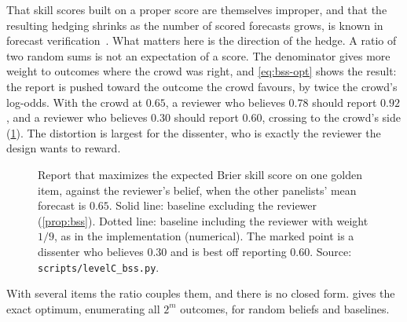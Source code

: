 That skill scores built on a proper score are themselves improper, and that the resulting hedging
shrinks as the number of scored forecasts grows, is known in forecast
verification~\cite{murphy1973hedging}. What matters here is the direction of the hedge. A ratio of
two random sums is not an expectation of a score. The denominator gives more weight to outcomes
where the crowd was right, and \eqref{eq:bss-opt} shows the result: the report is pushed
toward the outcome the crowd favours, by twice the crowd's log-odds. With the crowd at $0.65$,
a reviewer who believes $0.78$ should report $0.92$, and a reviewer who believes $0.30$ should
report $0.60$, crossing to the crowd's side (\cref{fig:bss}). The distortion is largest for the
dissenter, who is exactly the reviewer the design wants to reward.

\begin{figure}[t]
\centering
{}
\caption{Report that maximizes the expected Brier skill score on one golden item, against the
reviewer's belief, when the other panelists' mean forecast is $0.65$. Solid line: baseline
excluding the reviewer (\cref{prop:bss}). Dotted line: baseline including the reviewer with
weight $1/9$, as in the implementation (numerical). The marked point is a dissenter who
believes $0.30$ and is best off reporting $0.60$. Source: \texttt{scripts/levelC\_bss.py}.}
\label{fig:bss}
\end{figure}

With several items the ratio couples them, and there is no closed form.  gives the
exact optimum, enumerating all $2^m$ outcomes, for random beliefs and baselines.

